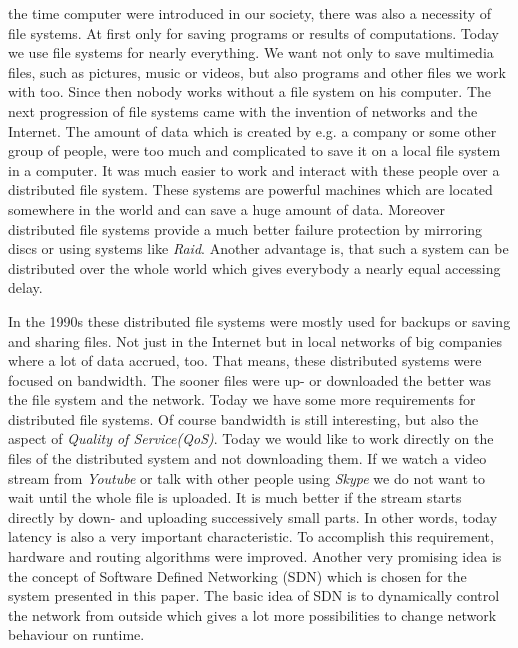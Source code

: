  the time computer were introduced in our society, there was also a necessity of file systems. At first only for saving programs or results of computations. Today we use file systems for nearly everything. We want not only to save multimedia files, such as pictures, music or videos, but also programs and other files we work with too. Since then nobody works without a file system on his computer. The next progression of file systems came with the invention of networks and the Internet. The amount of data which is created by e.g. a company or some other group of people, were too much and complicated to save it on a local file system in a computer. It was much easier to work and interact with these people over a distributed file system. These systems are powerful machines which are located somewhere in the world and can save a huge amount of data. Moreover distributed file systems provide a much better failure protection by mirroring discs or using systems like \textit{Raid}. Another advantage is, that such a system can be distributed over the whole world which gives everybody a nearly equal accessing delay.

In the 1990s these distributed file systems were mostly used for backups or saving and sharing files. Not just in the Internet but in local networks of big companies where a lot of data accrued, too. That means, these distributed systems were focused on bandwidth. The sooner files were up- or downloaded the better was the file system and the network. Today we have some more requirements for distributed file systems. Of course bandwidth is still interesting, but also the aspect of \textit{Quality of Service(QoS)}. Today we would like to work directly on the files of the distributed system and not downloading them. If we watch a video stream from \textit{Youtube} or talk with other people using \textit{Skype} we do not want to wait until the whole file is uploaded. It is much better if the stream starts directly by down- and uploading successively small parts. In other words, today latency is also a very important characteristic. To accomplish this requirement, hardware and routing algorithms were improved. Another very promising idea is the concept of Software Defined Networking (SDN) which is chosen for the system presented in this paper. The basic idea of SDN is to dynamically control the network from outside which gives a lot more possibilities to change network behaviour on runtime.

